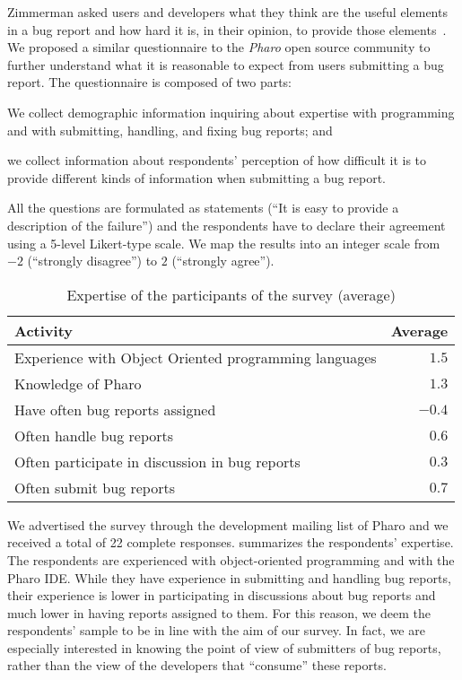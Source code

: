 Zimmerman \etal asked users and developers what they think are the useful elements in a bug report and how hard it is, in their opinion, to provide those elements~\cite{Zimm2010a}.
We proposed a similar questionnaire to the \emph{Pharo} open source community to further understand what it is reasonable to expect from users submitting a bug report.
The questionnaire is composed of two parts: \begin{inparaenum}[(1)]
\item We collect demographic information inquiring about expertise with programming and with submitting, handling, and fixing bug reports; and
\item we collect information about respondents' perception of how difficult it is to provide different kinds of information when submitting a bug report.
\end{inparaenum}
All the questions are formulated as statements (\eg ``It is easy to provide a description of the failure'') and the respondents have to declare their agreement using a 5-level Likert-type scale.
We map the results into an integer scale from $-2$ (\ie ``strongly disagree'') to $2$ (\ie ``strongly agree'').

\begin{table}[t]\small
\centering
\caption{Expertise of the participants of the survey (average)}\label{tab:survey}
\begin{tabular}{lr}
\rowcolor{tableheader} \textbf{Activity} & \textbf{Average} \\
\hline
Experience with Object Oriented programming languages & $1.5$ \\
Knowledge of Pharo & $1.3$ \\ \hline
Have often bug reports assigned & $-0.4$ \\
Often handle bug reports & $0.6$ \\
Often participate in discussion in bug reports & $0.3$ \\
Often submit bug reports & $0.7$ \\
\hline
\end{tabular}
\label{tab:survey-expertise}
\end{table}

We advertised the survey through the development mailing list of Pharo and we received a total of 22 complete responses.
 summarizes the respondents' expertise.
The respondents are experienced with object-oriented programming and with the Pharo IDE.
While they have experience in submitting and handling bug reports, their experience is lower in participating in discussions about bug reports and much lower in having reports assigned to them.
For this reason, we deem the respondents' sample to be in line with the aim of our survey.
In fact, we are especially interested in knowing the point of view of submitters of bug reports, rather than the view of the developers that ``consume'' these reports.


